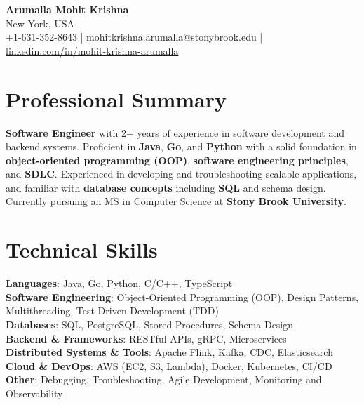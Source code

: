 \documentclass[letterpaper,11pt]{article}
\begin{document}
\begin{center}
  {\Large \textbf{Arumalla Mohit Krishna}} \\
  New York, USA \\
  +1-631-352-8643 \enspace | \enspace mohitkrishna.arumalla@stonybrook.edu \enspace | \enspace \href{https://www.linkedin.com/in/mohit-krishna-arumalla}{linkedin.com/in/mohit-krishna-arumalla}
\end{center}

\section{Professional Summary}
  \begin{itemize}[leftmargin=0.15in, label={}]
    \small{\item{
     \textbf{Software Engineer} with 2+ years of experience in software development and backend systems. Proficient in \textbf{Java}, \textbf{Go}, and \textbf{Python} with a solid foundation in \textbf{object-oriented programming (OOP)}, \textbf{software engineering principles}, and \textbf{SDLC}. Experienced in developing and troubleshooting scalable applications, and familiar with \textbf{database concepts} including \textbf{SQL} and schema design. Currently pursuing an MS in Computer Science at \textbf{Stony Brook University}.
    }}
  \end{itemize}
\vspace{-16pt}

\section{Technical Skills}
 \begin{itemize}[leftmargin=0.15in, label={}]
    \small{\item{
     \textbf{Languages}: Java, Go, Python, C/C++, TypeScript \\
     \textbf{Software Engineering}: Object-Oriented Programming (OOP), Design Patterns, Multithreading, Test-Driven Development (TDD) \\
     \textbf{Databases}: SQL, PostgreSQL, Stored Procedures, Schema Design \\
     \textbf{Backend \& Frameworks}: RESTful APIs, gRPC, Microservices \\
     \textbf{Distributed Systems \& Tools}: Apache Flink, Kafka, CDC, Elasticsearch \\
     \textbf{Cloud \& DevOps}: AWS (EC2, S3, Lambda), Docker, Kubernetes, CI/CD \\
     \textbf{Other}: Debugging, Troubleshooting, Agile Development, Monitoring and Observability
    }}
 \end{itemize}
\vspace{-16pt}
\end{document}
